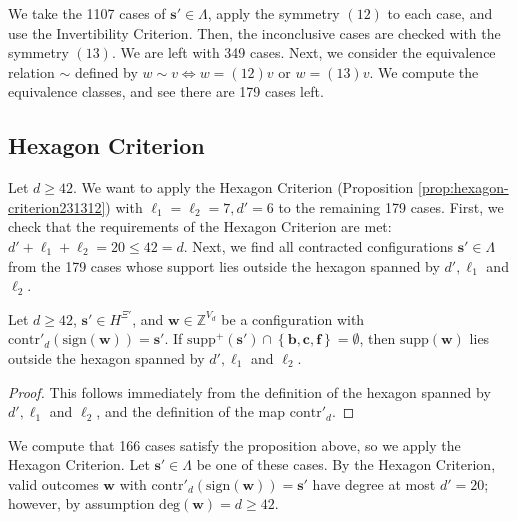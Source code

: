 We take the 1107 cases of \( \mathbf{s}' \in \Lambda \), apply the symmetry \( (12) \) to each case, and use the Invertibility Criterion. Then, the inconclusive cases are checked with the symmetry \( (13) \). We are left with 349 cases. Next, we consider the equivalence relation $\sim$ defined by $w \sim v \iff w = (12) v \text{ or } w = (13)v$. We compute the equivalence classes, and see there are 179 cases left. 

\subsection{Hexagon Criterion}

Let \( d \geq 42 \). We want to apply the Hexagon Criterion (Proposition \ref{prop:hexagon-criterion231312}) with \( \ell_1 = \ell_2 = 7, d' = 6 \) to the remaining 179 cases.
First, we check that the requirements of the Hexagon Criterion are met: \( d' + \ell_1 + \ell_2  = 20 \leq 42 = d \). Next, we find all contracted configurations \( \mathbf{s}' \in \Lambda \) from the 179 cases whose support lies outside the hexagon spanned by \( d', \ell_1 \) and \( \ell_2 \).

\begin{proposition}
    Let \( d \geq 42 \), \( \mathbf{s}' \in H^{\Xi'} \), and \( \mathbf{w} \in \mathbb{Z}^{V_d} \) be a configuration with \( \mathrm{contr}'_d(\mathrm{sign}(\mathbf{w})) = \mathbf{s}' \). If \( \mathrm{supp}^+(\mathbf{s}') \cap \left\{ \mathbf{b}, \mathbf{c}, \mathbf{f} \right\} = \emptyset\), then \( \mathrm{supp}(\mathbf{w}) \) lies outside the hexagon spanned by \( d', \ell_1 \) and \( \ell_2 \).
\end{proposition}

\begin{proof}
    This follows immediately from the definition of the hexagon spanned by \( d', \ell_1 \) and \( \ell_2 \), and the definition of the map \( \mathrm{contr}'_d \).
\end{proof}

We compute that 166 cases satisfy the proposition above, so we apply the Hexagon Criterion. Let \( \mathbf{s}' \in \Lambda \) be one of these cases. By the Hexagon Criterion, valid outcomes \( \mathbf{w} \) with \( \mathrm{contr}'_d(\mathrm{sign}(\mathbf{w})) = \mathbf{s}' \) have degree at most \( d' = 20 \); however, by assumption \( \mathrm{deg}(\mathbf{w}) = d \geq 42 \). 

